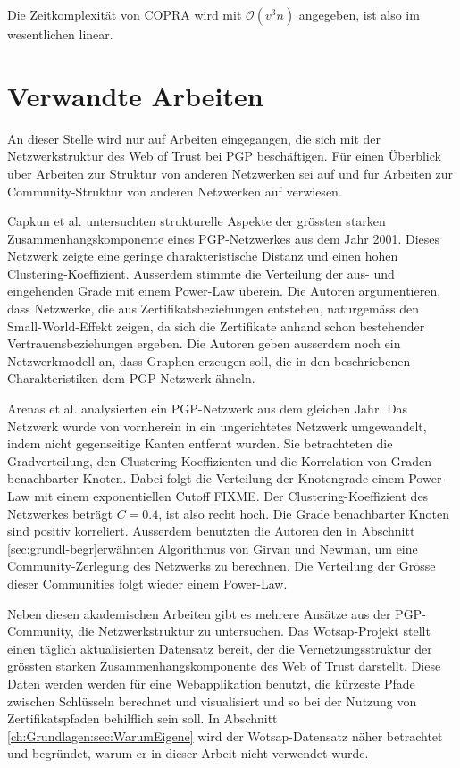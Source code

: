 Die Zeitkomplexit\"at von COPRA wird mit $\mathcal{O}(v^3n)$
angegeben, ist also im wesentlichen linear.

\section{Verwandte Arbeiten}
\label{ch:Grundlagen:sec:RelatedWork}

An dieser Stelle wird nur auf Arbeiten eingegangen, die sich mit der
Netzwerkstruktur des Web of Trust bei PGP besch\"aftigen. F\"ur einen
\"Uberblick \"uber Arbeiten zur Struktur von anderen Netzwerken sei
auf \cite{newman:167}und f\"ur Arbeiten zur Community-Struktur von
anderen Netzwerken auf \cite{Fortunato2010} verwiesen.

Capkun et al. \cite{Capkun2002} untersuchten strukturelle Aspekte der
gr\"ossten starken Zusammenhangskomponente eines PGP-Netzwerkes aus
dem Jahr 2001. Dieses Netzwerk zeigte eine geringe charakteristische
Distanz und einen hohen Clustering-Koeffizient. Ausserdem stimmte die
Verteilung der aus- und eingehenden Grade mit einem Power-Law
\"uberein. Die Autoren argumentieren, dass Netzwerke, die aus
Zertifikatsbeziehungen entstehen, naturgem\"ass den Small-World-Effekt
zeigen, da sich die Zertifikate anhand schon bestehender
Vertrauensbeziehungen ergeben. Die Autoren geben ausserdem noch ein
Netzwerkmodell an, dass Graphen erzeugen soll, die in den
beschriebenen Charakteristiken dem PGP-Netzwerk \"ahneln.

Arenas et al. \cite{Boguna2004} analysierten ein PGP-Netzwerk aus dem
gleichen Jahr. Das Netzwerk wurde von vornherein in ein ungerichtetes
Netzwerk umgewandelt, indem nicht gegenseitige Kanten entfernt
wurden. Sie betrachteten die Gradverteilung, den
Clustering-Koeffizienten und die Korrelation von Graden benachbarter
Knoten. Dabei folgt die Verteilung der Knotengrade einem Power-Law mit
einem exponentiellen Cutoff FIXME. Der Clustering-Koeffizient des
Netzwerkes betr\"agt $C=0.4$, ist also recht hoch. Die Grade
benachbarter Knoten sind positiv korreliert. Ausserdem benutzten die
Autoren den in Abschnitt \ref{sec:grundl-begr}erw\"ahnten Algorithmus
von Girvan und Newman, um eine Community-Zerlegung des Netzwerks zu
berechnen. Die Verteilung der Gr\"osse dieser Communities folgt wieder
einem Power-Law.

Neben diesen akademischen Arbeiten gibt es mehrere Ans\"atze aus der
PGP-Community, die Netzwerkstruktur zu untersuchen. Das
Wotsap-Projekt\cite{Cederlof} stellt einen t\"aglich aktualisierten
Datensatz bereit, der die Vernetzungsstruktur der gr\"ossten starken
Zusammenhangskomponente des Web of Trust darstellt. Diese Daten werden
werden f\"ur eine Webapplikation benutzt, die k\"urzeste Pfade
zwischen Schl\"usseln berechnet und visualisiert und so bei der
Nutzung von Zertifikatspfaden behilflich sein soll. In Abschnitt
\ref{ch:Grundlagen:sec:WarumEigene} wird der Wotsap-Datensatz n\"aher
betrachtet und begr\"undet, warum er in dieser Arbeit nicht verwendet
wurde. 

